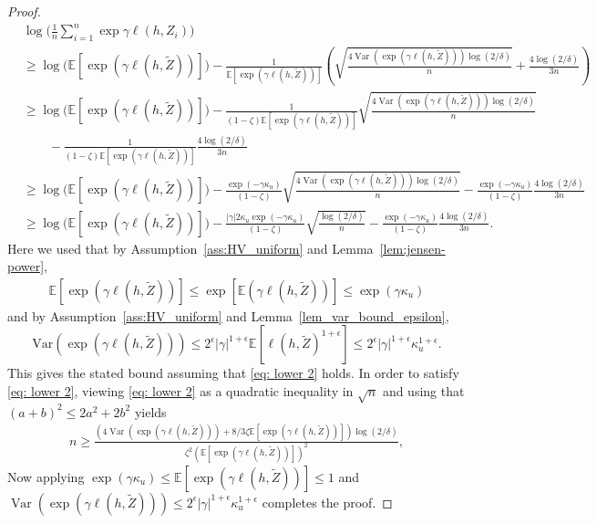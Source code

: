\documentclass{article}
\theoremstyle{plain}
\theoremstyle{plain}
\theoremstyle{definition}
\theoremstyle{remark}
\newcommand{\mbE}{\mathbb{E}}
\begin{document}
{\begin{proof}
\begin{equation}
    \begin{split}
         &\log\Big(\frac{1}{n}\sum_{i=1}^n \exp{\gamma \ell(h,Z_i)}\Big)
         \\ & \geq\log\Big(\mathbb{E}[\exp(\gamma \ell(h,\tilde Z))]\Big)- \frac{1}{\mathbb{E}[\exp(\gamma \ell(h,\tilde Z))]} \left( \sqrt{\frac{4\operatorname{Var}(\exp(\gamma \ell(h,\tilde Z)))\log(2/\delta)}{n}}+\frac{4\log(2/\delta)}{3n} \right) 
         \\  & \geq\log\Big(\mathbb{E}[\exp(\gamma \ell(h,\tilde Z))]\Big)- \frac{1}{(1-\zeta)\mathbb{E}[\exp(\gamma \ell(h,\tilde Z))]} \sqrt{\frac{4\operatorname{Var}(\exp(\gamma \ell(h,\tilde Z)))\log(2/\delta)}{n}}\\&\qquad-\frac{1}{(1-\zeta)\mathbb{E}[\exp(\gamma \ell(h,\tilde Z))]}\frac{4\log(2/\delta)}{3n}
         \\  & \geq\log\Big(\mathbb{E}[\exp(\gamma \ell(h,\tilde Z))]\Big)- \frac{\exp(-\gamma \kappa_u)}{(1-\zeta)} \sqrt{\frac{4\operatorname{Var}(\exp(\gamma \ell(h,\tilde Z)))\log(2/\delta)}{n}}-\frac{\exp(- \gamma \kappa_u)}{(1-\zeta)}\frac{4\log(2/\delta)}{3n}
         \\  & \geq \log\Big(\mathbb{E}[\exp(\gamma \ell(h,\tilde Z))]\Big)- \frac{|\gamma|2\kappa_u\exp(-\gamma \kappa_u)}{(1-\zeta)} \sqrt{\frac{\log(2/\delta)}{n}}-\frac{\exp(-\gamma \kappa_u)}{(1-\zeta)}\frac{4\log(2/\delta)}{3n}. 
    \end{split}
\end{equation}
Here we used that by Assumption~\ref{ass:HV_uniform} and Lemma~\ref{lem:jensen-power}, $$\begin{aligned} \mathbb{E}[\exp(\gamma \ell(h,\tilde Z))] \le \exp [\mathbb{E}(\gamma \ell(h,\tilde Z))] \le \exp( \gamma \kappa_u) \end{aligned}$$ and by Assumption~\ref{ass:HV_uniform} and Lemma~\ref{lem_var_bound_epsilon}, $$ \mathrm{Var} (\exp(\gamma \ell(h,\tilde Z))) \le 2^{\epsilon}|\gamma|^{1+\epsilon}\mbE[\ell(h,\tilde{Z})^{1+\epsilon}]\le 2^{\epsilon}|\gamma|^{1+\epsilon} \kappa_u^{1+\epsilon} . $$ This gives the stated bound assuming that \eqref{eq: lower 2} holds. In order to satisfy \eqref{eq: lower 2}, viewing \eqref{eq: lower 2} as a quadratic inequality in $\sqrt{n}$ and using that $(a+b)^2 \le 2 a^2 + 2 b^2$ yields $$\begin{aligned} n\geq \frac{(4\operatorname{Var}(\exp(\gamma \ell(h,\tilde Z)))+8/3 \zeta \mathbb{E}[\exp(\gamma \ell(h,\tilde Z))])\log(2/\delta)}{\zeta^2(\mathbb{E}[\exp(\gamma \ell(h,\tilde Z))])^2}, \end{aligned}$$
Now applying $\exp(\gamma \kappa_u)\leq\mathbb{E}[\exp(\gamma \ell(h,\tilde Z))]\leq 1$ and $\operatorname{Var}(\exp(\gamma \ell(h,\tilde Z)))\leq 2^{\epsilon}|\gamma|^{1+\epsilon} \kappa_u^{1+\epsilon}$ completes the proof.
\end{proof}

}
\end{document}
